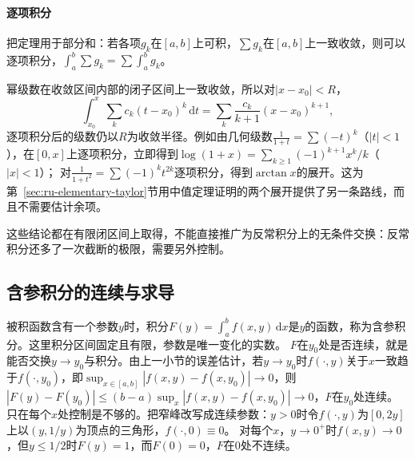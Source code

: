 \paragraph{逐项积分}
把定理用于部分和：若各项$g_k$在$[a,b]$上可积，$\sum g_k$在$[a,b]$上一致收敛，则可以逐项积分，$\int_a^b\sum g_k=\sum\int_a^bg_k$。

幂级数在收敛区间内部的闭子区间上一致收敛，所以对$|x-x_0|<R$，
\[
 \int_{x_0}^x\sum_kc_k(t-x_0)^k\,\mathrm dt=\sum_k\frac{c_k}{k+1}(x-x_0)^{k+1},
\]
逐项积分后的级数仍以$R$为收敛半径。例如由几何级数$\frac1{1+t}=\sum(-t)^k$（$|t|<1$），在$[0,x]$上逐项积分，立即得到$\log(1+x)=\sum_{k\geq1}(-1)^{k+1}x^k/k$（$|x|<1$）；
对$\frac1{1+t^2}=\sum(-1)^kt^{2k}$逐项积分，得到$\arctan x$的展开。这为第~\ref{sec:ru-elementary-taylor}节用中值定理证明的两个展开提供了另一条路线，而且不需要估计余项。

这些结论都在有限闭区间上取得，不能直接推广为反常积分上的无条件交换：反常积分还多了一次截断的极限，需要另外控制。

\subsection{含参积分的连续与求导}
\label{sec:ru-parametric-integrals}

被积函数含有一个参数$y$时，积分$F(y)=\int_a^bf(x,y)\,\mathrm dx$是$y$的函数，称为含参积分。这里积分区间固定且有限，参数是唯一变化的实数。
$F$在$y_0$处是否连续，就是能否交换$y\to y_0$与积分。由上一小节的误差估计，若$y\to y_0$时$f(\cdot,y)$关于$x$一致趋于$f(\cdot,y_0)$，即$\sup_{x\in[a,b]}|f(x,y)-f(x,y_0)|\to0$，则$|F(y)-F(y_0)|\leq(b-a)\sup_x|f(x,y)-f(x,y_0)|\to0$，$F$在$y_0$处连续。
只在每个$x$处控制是不够的。把窄峰改写成连续参数：$y>0$时令$f(\cdot,y)$为$[0,2y]$上以$(y,1/y)$为顶点的三角形，$f(\cdot,0)\equiv0$。
对每个$x$，$y\to0^+$时$f(x,y)\to0$，但$y\leq1/2$时$F(y)=1$，而$F(0)=0$，$F$在$0$处不连续。

